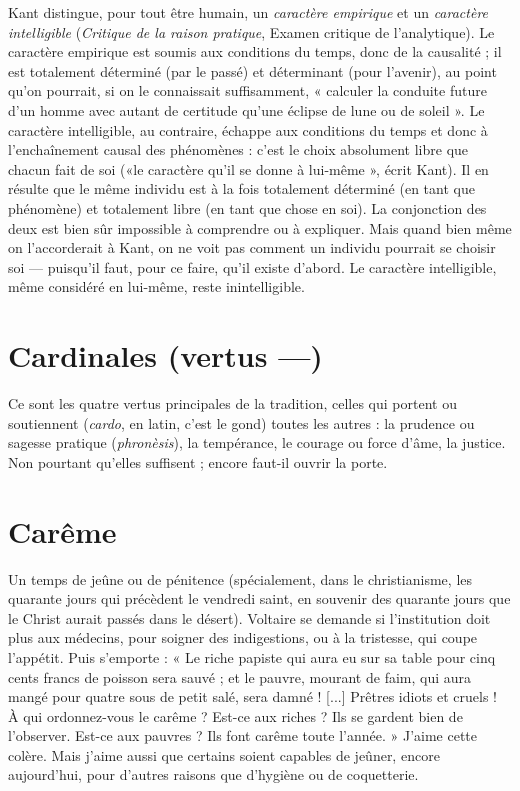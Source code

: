 Kant distingue, pour tout être humain, un {\it caractère empirique} et un {\it caractère
intelligible} ({\it Critique de la raison pratique}, Examen critique de l’analytique).
Le caractère empirique est soumis aux conditions du temps, donc de la
causalité ; il est totalement déterminé (par le passé) et déterminant (pour
l'avenir), au point qu’on pourrait, si on le connaissait suffisamment, « calculer
la conduite future d’un homme avec autant de certitude qu’une éclipse de lune
ou de soleil ». Le caractère intelligible, au contraire, échappe aux conditions du
temps et donc à l’enchaînement causal des phénomènes : c’est le choix absolument
libre que chacun fait de soi («le caractère qu’il se donne à lui-même »,
écrit Kant). Il en résulte que le même individu est à la fois totalement déterminé
(en tant que phénomène) et totalement libre (en tant que chose en soi).
La conjonction des deux est bien sûr impossible à comprendre ou à expliquer.
Mais quand bien même on l’accorderait à Kant, on ne voit pas comment un
individu pourrait se choisir soi — puisqu'il faut, pour ce faire, qu’il existe
d’abord. Le caractère intelligible, même considéré en lui-même, reste inintelligible.

\section{Cardinales (vertus —)}
Ce sont les quatre vertus principales de la tradition,
celles qui portent ou soutiennent ({\it cardo},
en latin, c’est le gond) toutes les autres : la prudence ou sagesse pratique ({\it phronèsis}),
la tempérance, le courage ou force d’âme, la justice. Non pourtant
qu’elles suffisent ; encore faut-il ouvrir la porte.

\section{Carême}
Un temps de jeûne ou de pénitence (spécialement, dans le christianisme,
les quarante jours qui précèdent le vendredi saint, en
souvenir des quarante jours que le Christ aurait passés dans le désert). Voltaire
se demande si l'institution doit plus aux médecins, pour soigner des indigestions,
ou à la tristesse, qui coupe l'appétit. Puis s’emporte : « Le riche papiste
qui aura eu sur sa table pour cinq cents francs de poisson sera sauvé ; et le
pauvre, mourant de faim, qui aura mangé pour quatre sous de petit salé, sera
damné ! [...] Prêtres idiots et cruels ! À qui ordonnez-vous le carême ? Est-ce
aux riches ? Ils se gardent bien de l’observer. Est-ce aux pauvres ? Ils font
carême toute l’année. » J'aime cette colère. Mais j'aime aussi que certains soient
capables de jeûner, encore aujourd’hui, pour d’autres raisons que d’hygiène ou
de coquetterie.

